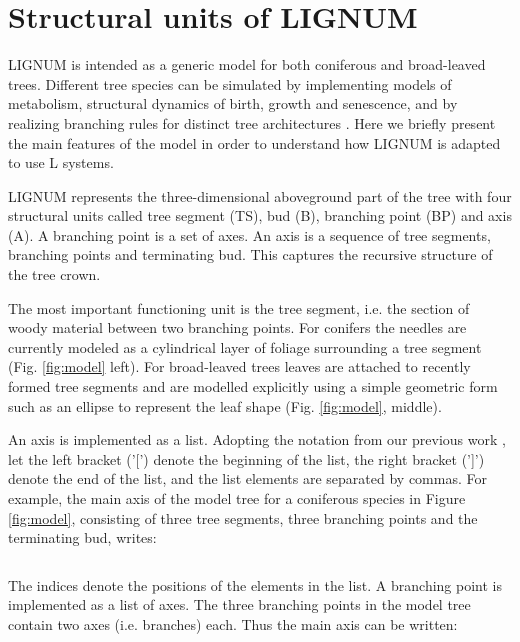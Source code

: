 \section{Structural units  of LIGNUM} 

LIGNUM  is intended   as a  generic   model  for  both coniferous  and
broad-leaved trees.  Different   tree   species can be   simulated  by
implementing  models  of  metabolism,  structural  dynamics of  birth,
growth and senescence, and by  realizing branching rules for  distinct
tree   architectures   \citep{perttunen:96,  perttunen:01}.   Here  we
briefly present the main features of the model  in order to understand
how LIGNUM is adapted to use L systems.

LIGNUM represents  the three-dimensional aboveground part  of the tree
with  four  structural  units  called  tree  segment  (TS),  bud  (B),
branching point  (BP) and  axis (A).   A branching point  is a  set of
axes. An  axis is  a sequence of  tree segments, branching  points and
terminating bud.   This captures the  recursive structure of  the tree
crown.

The  most important  functioning unit  is the tree  segment, i.e.  the
section of woody material between  two branching points.  For conifers
the needles are currently  modeled as a  cylindrical layer  of foliage
surrounding a    tree  segment   (Fig.  \ref{fig:model}    left).  For
broad-leaved  trees  leaves are    attached  to recently   formed tree
segments and  are modelled  explicitly  using a simple  geometric form
such as an ellipse to  represent the leaf shape (Fig. \ref{fig:model},
middle).

An  axis is implemented  as a  list.  Adopting  the notation  from our
previous work \citet{perttunen:96}, let  the left bracket ('[') denote
the beginning of  the list, the right bracket (']')  denote the end of
the list, and the list  elements are separated by commas. For example,
the main  axis of the  model tree for  a coniferous species  in Figure
\ref{fig:model},  consisting of three  tree segments,  three branching
points and the terminating bud, writes:

\begin{equation}
[TS_0,BP_1,TS_2,BP_3,TS_4,BP_5,B_6]
\end{equation}

The  indices denote  the positions  of the  elements in  the  list.  A
branching point is implemented as a list of axes.  The three branching
points in the model tree  contain two axes (i.e.  branches) each. Thus
the main axis can be written:

